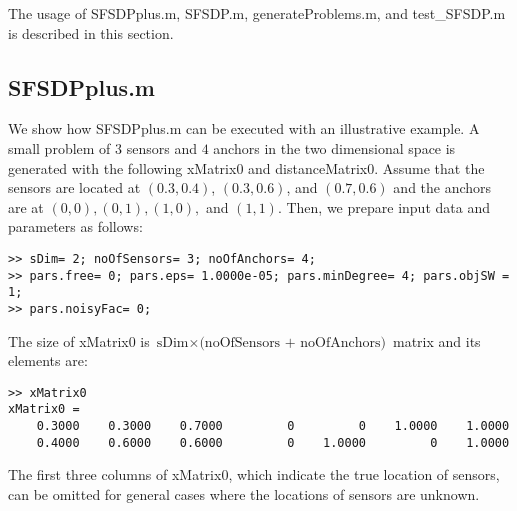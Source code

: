 \documentclass[12pt]{article}
\begin{document}
The usage of SFSDPplus.m, SFSDP.m, generateProblems.m, and test\_SFSDP.m is described 
in this section.

\subsection{SFSDPplus.m}
\label{SFSDPplus}

We show how SFSDPplus.m can be executed with an illustrative example.
A small problem of $3$ sensors and $4$ anchors
in the two dimensional space
is generated with the following xMatrix0 and distanceMatrix0. 
Assume that the sensors are located at $(0.3, 0.4)$, $(0.3, 0.6)$, and $(0.7, 0.6)$
and the anchors are at $(0, 0), (0,1), (1, 0), $ and $(1,1)$. Then,
we prepare input data and parameters as follows:
\begin{verbatim}
>> sDim= 2; noOfSensors= 3; noOfAnchors= 4;
>> pars.free= 0; pars.eps= 1.0000e-05; pars.minDegree= 4; pars.objSW = 1;
>> pars.noisyFac= 0; 
\end{verbatim} 
The size of 
xMatrix0 is 
$\mbox{sDim} \times \mbox{(noOfSensors + noOfAnchors)}$ matrix
and its elements  are:
\begin{verbatim}
>> xMatrix0
xMatrix0 =
    0.3000    0.3000    0.7000         0         0    1.0000    1.0000
    0.4000    0.6000    0.6000         0    1.0000         0    1.0000
\end{verbatim} 
The first three columns of xMatrix0, which indicate the
 true location of sensors, can be omitted
 for general cases where  the locations of sensors are unknown.
\end{document}
